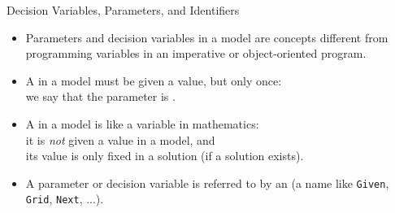 \documentclass{cons-beamer}
\begin{document}
\begin{frame}{Decision Variables, Parameters, and Identifiers} 
  \begin{itemize}
    \item Parameters and decision variables in a model are concepts different from programming variables in an imperative or object-oriented program. \vfill
    
    \item A  in a model must be given a value, but only once: \\
    we say that the parameter is . \vfill
    
    \item A  in a model is like a variable in mathematics: \\
          it is \emph{not} given a value in a model, and \\
          its value is only fixed in a solution (if a solution exists). \vfill
          
    \item A parameter or decision variable is referred to by an  (a name like \texttt{Given}, \texttt{Grid}, \texttt{Next}, ...). \vfill
    
  \end{itemize}
\end{frame}
\end{document}
